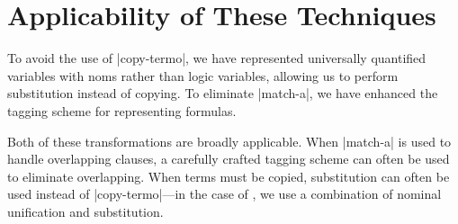 \section{Applicability of These Techniques}

To avoid the use of \scheme|copy-termo|, we have represented
universally quantified variables with noms rather than logic
variables, allowing us to perform substitution instead of copying.  To
eliminate \scheme|match-a|, we have enhanced the tagging scheme for
representing formulas.

Both of these transformations are broadly applicable. When
\scheme|match-a| is used to handle overlapping clauses, a carefully
crafted tagging scheme can often be used to eliminate
overlapping. When terms must be copied, substitution can often be used
instead of \scheme|copy-termo|---in the case of \alphatap, we use a
combination of nominal unification and substitution.
